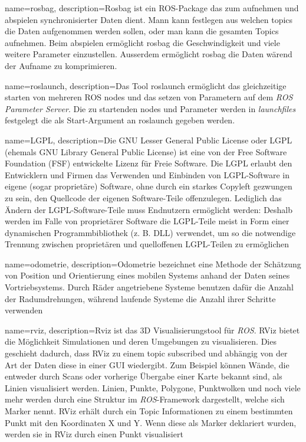 {
{
  name={rosbag},
  description={Rosbag ist ein ROS-Package das zum aufnehmen und abspielen synchronisierter Daten dient. Mann kann festlegen aus welchen \Glspl{topic} die Daten aufgenommen werden sollen, oder man kann die gesamten Topics aufnehmen. Beim abspielen ermöglicht rosbag die Geschwindigkeit und viele weitere Parameter einzustellen. Ausserdem ermöglicht rosbag die Daten wärend der Aufname zu komprimieren.}
}

{
  name={roslaunch},
  description={Das Tool roslaunch ermöglicht das gleichzeitige starten von mehreren ROS \Glspl{node} und das setzen von Parametern auf dem \emph{ROS Parameter Server}. Die zu startenden \Glspl{node} und Parameter werden in \emph{launchfiles} festgelegt die als Start-Argument an roslaunch gegeben werden. }
}

{
  name={LGPL},
  description={Die GNU Lesser General Public License oder LGPL (ehemals GNU Library General Public License) ist eine von der Free Software Foundation (FSF) entwickelte Lizenz für Freie Software. Die LGPL erlaubt den Entwicklern und Firmen das Verwenden und Einbinden von LGPL-Software in eigene (sogar proprietäre) Software, ohne durch ein starkes Copyleft gezwungen zu sein, den Quellcode der eigenen Software-Teile offenzulegen. Lediglich das Ändern der LGPL-Software-Teile muss Endnutzern ermöglicht werden: Deshalb werden im Falle von proprietärer Software die LGPL-Teile meist in Form einer dynamischen Programmbibliothek (z. B. DLL) verwendet, um so die notwendige Trennung zwischen proprietären und quelloffenen LGPL-Teilen zu ermöglichen}
}

{
  name={odometrie},
  description={Odometrie bezeichnet eine Methode der Schätzung von Position und Orientierung eines mobilen Systems anhand der Daten seines Vortriebsystems. Durch Räder angetriebene Systeme benutzen dafür die Anzahl der Radumdrehungen, während laufende Systeme die Anzahl ihrer Schritte verwenden}
}

{
  name={rviz},
  description={Rviz ist das 3D Visualisierungstool für \emph{ROS}. RViz bietet die Möglichkeit Simulationen und deren Umgebungen zu visualisieren. Dies geschieht dadurch, dass RViz zu einem \Gls{topic} subscribed und abhängig von der Art der Daten diese in einer GUI wiedergibt. Zum Beispiel können Wände, die entweder durch Scans oder vorherige Übergabe einer Karte bekannt sind, als Linien visualisiert werden. Linien, Punkte, Polygone, Punktwolken und noch viele mehr werden durch eine Struktur im \emph{ROS}-Framework dargestellt, welche sich Marker nennt. RViz erhält durch ein Topic Informationen zu einem bestimmten Punkt mit den Koordinaten X und Y.
Wenn diese als Marker deklariert wurden, werden sie in RViz durch einen Punkt visualisiert}
}

}
